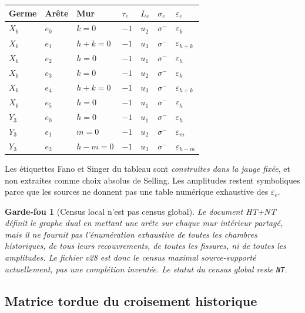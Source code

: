 \documentclass[11pt,a4paper]{article}
\newtheorem{guardrail}[theorem]{Garde-fou}
\newcommand{\certNT}{\texttt{NT}}
\begin{document}
\begin{longtable}{p{}p{}p{}p{}p{}p{}p{}}
\toprule
Germe & Arête & Mur & $\tau_e$ & $L_e$ & $\sigma_e$ & $\varepsilon_e$\\
\midrule
\endhead
$X_6$ & $e_0$ & $k=0$ & $-1$ & $u_2$ & $\sigma^-$ & $\varepsilon_k$\\
$X_6$ & $e_1$ & $h+k=0$ & $-1$ & $u_3$ & $\sigma^-$ & $\varepsilon_{h+k}$\\
$X_6$ & $e_2$ & $h=0$ & $-1$ & $u_1$ & $\sigma^-$ & $\varepsilon_h$\\
$X_6$ & $e_3$ & $k=0$ & $-1$ & $u_2$ & $\sigma^-$ & $\varepsilon_k$\\
$X_6$ & $e_4$ & $h+k=0$ & $-1$ & $u_3$ & $\sigma^-$ & $\varepsilon_{h+k}$\\
$X_6$ & $e_5$ & $h=0$ & $-1$ & $u_1$ & $\sigma^-$ & $\varepsilon_h$\\
$Y_3$ & $e_0$ & $h=0$ & $-1$ & $u_1$ & $\sigma^-$ & $\varepsilon_h$\\
$Y_3$ & $e_1$ & $m=0$ & $-1$ & $u_2$ & $\sigma^-$ & $\varepsilon_m$\\
$Y_3$ & $e_2$ & $h-m=0$ & $-1$ & $u_3$ & $\sigma^-$ & $\varepsilon_{h-m}$\\
\bottomrule
\end{longtable}

Les étiquettes Fano et Singer du tableau sont \emph{construites dans la jauge fixée}, et non extraites comme choix absolus de Selling. Les amplitudes restent symboliques parce que les sources ne donnent pas une table numérique exhaustive des $\varepsilon_e$.

\begin{guardrail}[Census local n'est pas census global]
Le document HT+NT définit le graphe dual en mettant une arête sur chaque mur intérieur partagé, mais il ne fournit pas l'énumération exhaustive de toutes les chambres historiques, de tous leurs recouvrements, de toutes les fissures, ni de toutes les amplitudes. Le fichier v28 est donc le \emph{census maximal source-supporté actuellement}, pas une complétion inventée. Le statut du census global reste \certNT{}.
\end{guardrail}

\subsection{Matrice tordue du croisement historique}
\end{document}
